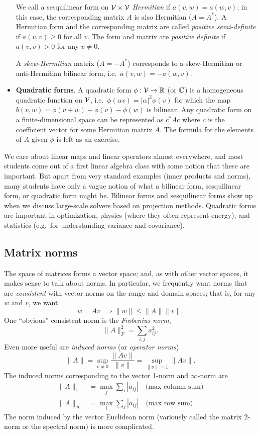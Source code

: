 \documentclass[12pt, leqno]{article}
\begin{document}
\begin{itemize}
  We call a sesquilinear form on $\mathcal{V} \times \mathcal{V}$ {\em Hermitian} if
  $a(v,w) = a(w,v)$; in this case, the corresponding matrix $A$ is
  also Hermitian ($A = A^*$).  A Hermitian form and the corresponding
  matrix are called {\em positive semi-definite} if $a(v,v) \geq 0$
  for all $v$.  The form and matrix are {\em positive definite} if
  $a(v,v) > 0$ for any $v \neq 0$.

  A {\em skew-Hermitian} matrix
  ($A = -A^*$) corresponds to a skew-Hermitian or anti-Hermitian bilinear
  form, i.e.~$a(v,w) = -a(w,v)$.
\item {\bf Quadratic forms}.  A quadratic form $\phi : \mathcal{V}
  \rightarrow \mathbb{R}$ (or $\mathbb{C}$) is a homogeneous quadratic function
  on $\mathcal{V}$, i.e.~$\phi(\alpha v) = |\alpha|^2 \phi(v)$ for which the
  map $b(v,w) = \phi(v+w) - \phi(v) - \phi(w)$ is bilinear.
  Any quadratic form on a finite-dimensional space can be
  represented as $c^* A c$ where $c$ is the coefficient vector for
  some Hermitian matrix $A$.  The formula for the elements of $A$
  given $\phi$ is left as an exercise.
\end{itemize}
We care about linear maps and linear operators almost everywhere, and
most students come out of a first linear algebra class with some
notion that these are important.  But apart from very standard
examples (inner products and norms), many students have only a vague
notion of what a bilinear form, sesquilinear form, or quadratic form
might be.  Bilinear forms and sesquilinear forms show up when we
discuss large-scale solvers based on projection methods.  Quadratic
forms are important in optimization, physics (where they often
represent energy), and statistics (e.g.~for understanding variance and
covariance).

\subsection{Matrix norms}

The space of matrices forms a vector space; and, as with other vector
spaces, it makes sense to talk about norms.  In particular, we
frequently want norms that are {\em consistent} with vector norms
on the range and domain spaces; that is, for any $w$ and $v$,
we want
\[
  w = Av \implies \|w\| \leq \|A\| \|v\|.
\]
One ``obvious'' consistent norm is the {\em Frobenius norm},
\[
  \|A\|_F^2 = \sum_{i,j} a_{ij}^2.
\]
Even more useful are {\em induced norms} (or {\em operator norms})
\[
  \|A\| = \sup_{v \neq 0} \frac{\|Av\|}{\|v\|} = \sup_{\|v\|=1} \|Av\|.
\]
The induced norms corresponding to the vector 1-norm and $\infty$-norm
are
\begin{align*}
  \|A\|_1 &= \max_j \sum_i |a_{ij}| \quad \mbox{(max column sum)}\\
  \|A\|_\infty &= \max_i \sum_j |a_{ij}| \quad \mbox{(max row sum)}
\end{align*}
The norm induced by the vector Euclidean norm (variously called
the matrix 2-norm or the spectral norm) is more complicated.
\end{document}
